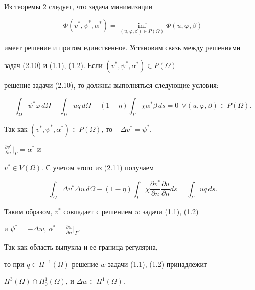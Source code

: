  


 


Из теоремы 2 следует, что задача минимизации 


\begin{equation} 


\Phi(v^*,\psi^*,\alpha^*)=\inf_{(u,\varphi,\beta)\in P(\Omega)} 


\Phi(u,\varphi,\beta) 


\end{equation} 


имеет решение и притом единственное. Установим связь между решениями 


задач (2.10) и (1.1), (1.2). Если $(v^*,\psi^*,\alpha^*)\in P(\Omega)$ --- 


решение задачи (2.10), то должны выполняться следующие условия: 


\begin{equation} 


\int_\Omega \psi^*\varphi\,d\Omega-\int_\Omega uq\,d\Omega- 


(1-\eta)\int_\Gamma \chi\alpha^*\beta\,ds=0\ \ \forall(u,\varphi,\beta) 


\in P(\Omega). 


\end{equation} 


Так как $(v^*,\psi^*,\alpha^*)\in P(\Omega)$, то $-\Delta v^*=\psi^*$, 


$\frac{\partial v^*}{\partial n}\big|_\Gamma=\alpha^*$ и 


$v^*\in V(\Omega)$. С учетом этого из (2.11) получаем 


$$ 


\int_\Omega \Delta v^*\Delta u\,d\Omega-(1-\eta)\int_\Gamma 


\chi\frac{\partial v^*}{\partial n}\frac{\partial u}{\partial n}ds= 


\int_\Gamma uq\,ds. 


$$ 


 


Таким образом, $v^*$ совпадает с решением $w$ задачи (1.1), (1.2) 


и $\psi^*=-\Delta w$, $\alpha^*=\frac{\partial w}{\partial n}\big|_\Gamma$. 


 


\begin{notenonum} 


Так как область выпукла и ее граница регулярна, 


то при $q\in H^{-1}(\Omega)$ решение $w$ задачи (1.1), (1.2) принадлежит 


$H^3(\Omega)\cap H^1_0(\Omega)$, и $\Delta w\in H^1(\Omega)$. 


\end{notenonum} 


